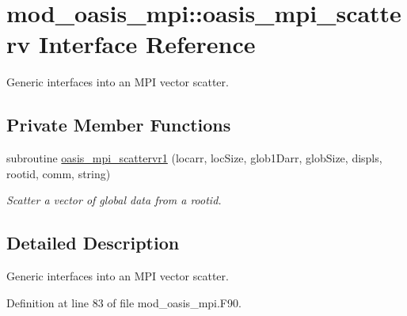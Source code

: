 \hypertarget{interfacemod__oasis__mpi_1_1oasis__mpi__scatterv}{\section{mod\+\_\+oasis\+\_\+mpi\+:\+:oasis\+\_\+mpi\+\_\+scatterv Interface Reference}
\label{interfacemod__oasis__mpi_1_1oasis__mpi__scatterv}
}


Generic interfaces into an M\+P\+I vector scatter.  


\subsection*{Private Member Functions}
\begin{DoxyCompactItemize}
\item 
subroutine \hyperlink{interfacemod__oasis__mpi_1_1oasis__mpi__scatterv_a3fcba01cf7b4de3c6c05fa8999f5c00d}{oasis\+\_\+mpi\+\_\+scattervr1} (locarr, loc\+Size, glob1\+Darr, glob\+Size, displs, rootid, comm, string)
\begin{DoxyCompactList}\small\item\em Scatter a vector of global data from a rootid. \end{DoxyCompactList}\end{DoxyCompactItemize}


\subsection{Detailed Description}
Generic interfaces into an M\+P\+I vector scatter. 

Definition at line 83 of file mod\+\_\+oasis\+\_\+mpi.\+F90.



